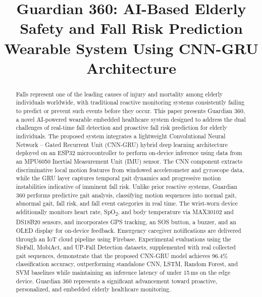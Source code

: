 \documentclass[conference]{IEEEtran}
\begin{document}
\title{Guardian 360: AI-Based Elderly Safety and Fall Risk Prediction Wearable System Using CNN-GRU Architecture}

\author{
}

\maketitle

\begin{abstract}
Falls represent one of the leading causes of injury and mortality among elderly individuals worldwide, with traditional reactive monitoring systems consistently failing to predict or prevent such events before they occur. This paper presents Guardian 360, a novel AI-powered wearable embedded healthcare system designed to address the dual challenges of real-time fall detection and proactive fall risk prediction for elderly individuals. The proposed system integrates a lightweight Convolutional Neural Network -- Gated Recurrent Unit (CNN-GRU) hybrid deep learning architecture deployed on an ESP32 microcontroller to perform on-device inference using data from an MPU6050 Inertial Measurement Unit (IMU) sensor. The CNN component extracts discriminative local motion features from windowed accelerometer and gyroscope data, while the GRU layer captures temporal gait dynamics and progressive motion instabilities indicative of imminent fall risk. Unlike prior reactive systems, Guardian 360 performs predictive gait analysis, classifying motion sequences into normal gait, abnormal gait, fall risk, and fall event categories in real time. The wrist-worn device additionally monitors heart rate, SpO\textsubscript{2}, and body temperature via MAX30102 and DS18B20 sensors, and incorporates GPS tracking, an SOS button, a buzzer, and an OLED display for on-device feedback. Emergency caregiver notifications are delivered through an IoT cloud pipeline using Firebase. Experimental evaluations using the SisFall, MobiAct, and UP-Fall Detection datasets, supplemented with real collected gait sequences, demonstrate that the proposed CNN-GRU model achieves 96.4\% classification accuracy, outperforming standalone CNN, LSTM, Random Forest, and SVM baselines while maintaining an inference latency of under 15\,ms on the edge device. Guardian 360 represents a significant advancement toward proactive, personalized, and embedded elderly healthcare monitoring.
\end{abstract}
\end{document}
